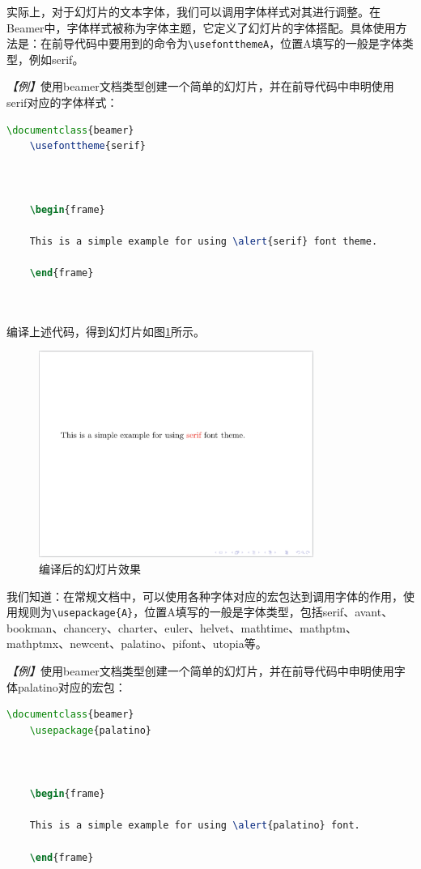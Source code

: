 实际上，对于幻灯片的文本字体，我们可以调用字体样式对其进行调整。在Beamer中，字体样式被称为字体主题，它定义了幻灯片的字体搭配。具体使用方法是：在前导代码中要用到的命令为\texttt{\textbackslash{}usefonttheme{A}}，位置A填写的一般是字体类型，例如serif。

\emph{【例】}使用beamer文档类型创建一个简单的幻灯片，并在前导代码中申明使用serif对应的字体样式：
\begin{lstlisting}[language=TeX]
    \documentclass{beamer}
    \usefonttheme{serif}

    

    \begin{frame}

    This is a simple example for using \alert{serif} font theme.

    \end{frame}

    
\end{lstlisting}

编译上述代码，得到幻灯片如图\ref{figeg:004}所示。

\begin{figure}[htbp]
    \centering
    \includegraphics[width = 0.8\textwidth]{images/ch_9/example_sec2_3.png}
    \caption{编译后的幻灯片效果}
    \label{figeg:004}
\end{figure}

我们知道：在常规文档中，可以使用各种字体对应的宏包达到调用字体的作用，使用规则为\texttt{\textbackslash{}usepackage\{A\}}，位置A填写的一般是字体类型，包括serif、avant、bookman、chancery、charter、euler、helvet、mathtime、mathptm、mathptmx、newcent、palatino、pifont、utopia等。

\emph{【例】}使用beamer文档类型创建一个简单的幻灯片，并在前导代码中申明使用字体palatino对应的宏包：
\begin{lstlisting}[language=TeX]
    \documentclass{beamer}
    \usepackage{palatino}

    

    \begin{frame}

    This is a simple example for using \alert{palatino} font.

    \end{frame}

    
\end{lstlisting}

